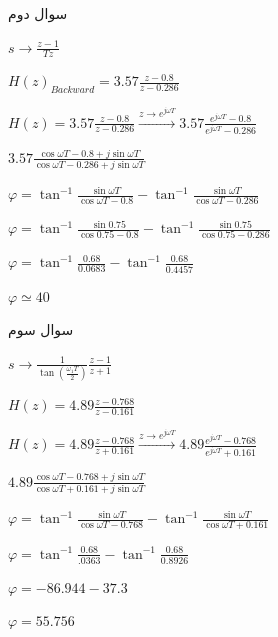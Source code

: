 \documentclass[12pt]{article}
\begin{document}
\begin{problem}{سوال دوم}
    	
    	$s\to \frac{z-1}{Tz}$
    	
    	$H{{(z)}_{Backward}}=3.57\frac{z-0.8}{z-0.286}$
    	
    	$
    		 H(z)=3.57\frac{z-0.8}{z-0.286}\xrightarrow{z\to {{e}^{j\omega T}}}3.57\frac{{{e}^{j\omega T}}-0.8}{{{e}^{j\omega T}}-0.286}
    	$	 
    	
    	$	  
    		3.57\frac{\cos \omega T-0.8+j\sin \omega T}{\cos \omega T-0.286+j\sin \omega T}
    	$
    	
    	 
    	$	 \varphi ={{\tan }^{-1}}\frac{\sin \omega T}{\cos \omega T-0.8}-{{\tan }^{-1}}\frac{\sin \omega T}{\cos \omega T-0.286} 
    	$
    	
    	$
    		 \varphi ={{\tan }^{-1}}\frac{\sin 0.75}{\cos 0.75-0.8}-{{\tan }^{-1}}\frac{\sin 0.75}{\cos 0.75-0.286}	 
    	$
    	
    	$ 
    		 \varphi ={{\tan }^{-1}}\frac{0.68}{0.0683}-{{\tan }^{-1}}\frac{0.68}{0.4457} 
    	$
    	
    	$ 
    		 \varphi \simeq 40
    	$

    \end{problem}
    
    \begin{problem}{سوال سوم}
    	\raggedleft
    	
    	$s\to \frac{1}{\tan (\frac{{{\omega }_{1}}T}{2})}\frac{z-1}{z+1}$
    	
    	
    	$H(z)=4.89\frac{z-0.768}{z-0.161}$
    	
    	$
    		H(z)=4.89\frac{z-0.768}{z+0.161}\xrightarrow{z\to {{e}^{j\omega T}}}4.89\frac{{{e}^{j\omega T}}-0.768}{{{e}^{j\omega T}}+0.161} 
    	$
    	
    	$ 
    		4.89\frac{\cos \omega T-0.768+j\sin \omega T}{\cos \omega T+0.161+j\sin \omega T}
    	$
    	
    	$ 
    		\varphi ={{\tan }^{-1}}\frac{\sin \omega T}{\cos \omega T-0.768}-{{\tan }^{-1}}\frac{\sin \omega T}{\cos \omega T+0.161}
    	$
    	
    	$ 
    		\varphi ={{\tan }^{-1}}\frac{0.68}{.0363}-{{\tan }^{-1}}\frac{0.68}{0.8926}
    	$
    	
    	$ 
    		\varphi =-86.944-37.3
    	$
    	
    	$ 
    		\varphi =55.756 
    	$
    	
    \end{problem}
    
\end{document}
